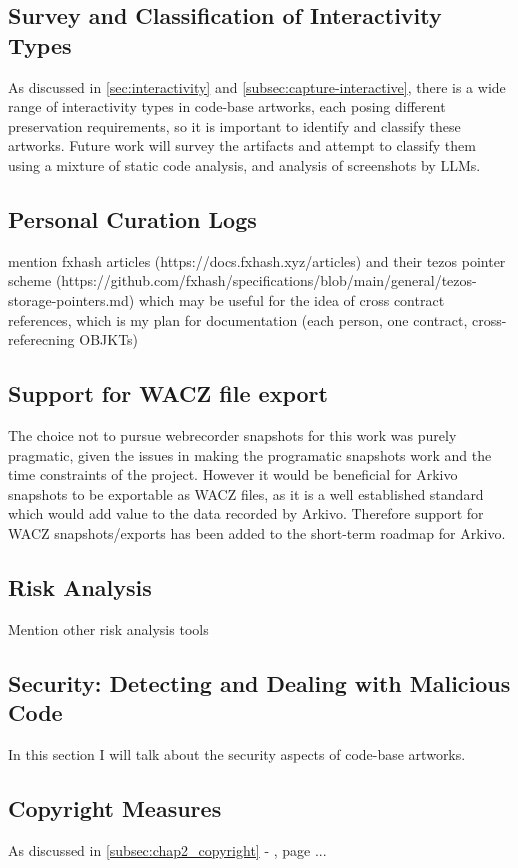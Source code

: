 \subsection{Survey and Classification of Interactivity Types}

As discussed in \autoref{sec:interactivity} and \autoref{subsec:capture-interactive}, there is a wide range of interactivity types in code-base artworks, each posing different preservation requirements, so it is important to identify and classify these artworks. Future work will survey the artifacts and attempt to classify them using a mixture of static code analysis, and analysis of screenshots by LLMs.


\subsection{Personal Curation Logs}

mention fxhash articles (https://docs.fxhash.xyz/articles) and their tezos pointer scheme (https://github.com/fxhash/specifications/blob/main/general/tezos-storage-pointers.md) which may be useful for the idea of cross contract references, which is my plan for documentation (each person, one contract, cross-referecning OBJKTs)

\subsection{Support for WACZ file export}

The choice not to pursue webrecorder snapshots for this work was purely pragmatic, given the issues in making the programatic snapshots work and the time constraints of the project. However it would be beneficial for Arkivo snapshots to be exportable as WACZ files, as it is a well established standard which would add value to the data recorded by Arkivo. Therefore support for WACZ snapshots/exports has been added to the short-term roadmap for Arkivo.

\subsection{Risk Analysis}

Mention other risk analysis tools \cite{l2beatL2BEATStateLayer2024}


\subsection{Security: Detecting and Dealing with Malicious Code}

In this section I will talk about the security aspects of code-base artworks.





\subsection{Copyright Measures}


As discussed in \autoref{subsec:chap2_copyright} -  , page \pageref{subsec:chap2_copyright}... 